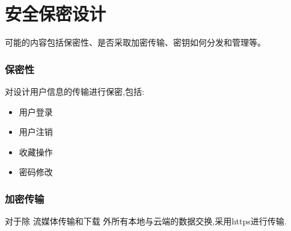 \chapter{安全保密设计}
可能的内容包括保密性、是否采取加密传输、密钥如何分发和管理等。

\subsection{保密性}

对设计用户信息的传输进行保密,包括:
\begin{itemize}
	\item 用户登录
	\item 用户注销
	\item 收藏操作
	\item 密码修改
\end{itemize}

\subsection{加密传输}

对于除 流媒体传输和下载 外所有本地与云端的数据交换,采用https进行传输.